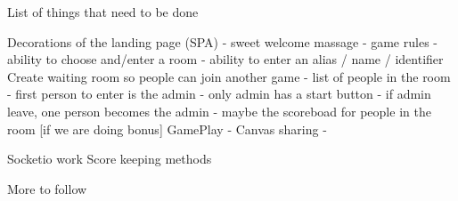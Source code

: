 List of things that need to be done

Decorations of the landing page (SPA)
    - sweet welcome massage
    - game rules
    - ability to choose and/enter a room
    - ability to enter an alias / name / identifier
Create waiting room so people can join another game
    - list of people in the room
    - first person to enter is the admin
    - only admin has a start button
    - if admin leave, one person becomes the admin
    - maybe the scoreboad for people in the room [if we are doing bonus]
GamePlay
    - Canvas sharing
    - 
    
Socketio work
Score keeping methods

More to follow
